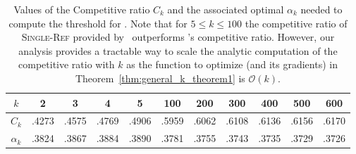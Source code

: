 \begin{table}[ht!]
    \centering
    \caption{Values of the Competitive ratio $C_k$ and the associated optimal $\alpha_k$ needed to compute the threshold for \algoname. Note that for $5\leq k\leq 100$ the competitive ratio of \textsc{Single-Ref} provided by~\citet{albers2020new} outperforms \algoname's competitive ratio. However, our analysis provides a tractable way to scale the analytic computation of the competitive ratio with $k$ as the function to optimize (and its gradients) in Theorem~\ref{thm:general_k_theorem1} is $\mathcal{O}(k)$.}
    \vspace{2pt}
    \begin{tabular}{ccccccccccc}
     \toprule
          $k$ & 2 &3 & 4 & 5 & 100 & 200 &300 &400 & 500 & 600\\
         \midrule
        $C_k$ & .4273&.4575&.4769&.4906&.5959&.6062&.6108&.6136&.6156&.6170 \\
        $\alpha_k$ & .3824 &.3867&.3884&.3890&.3781 &.3755 &.3743&.3735&.3729&.3726 \\
        \bottomrule
    \end{tabular}
    \label{tab:C_k}
\end{table}